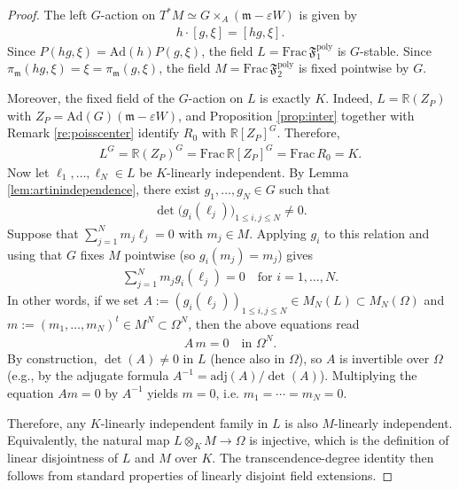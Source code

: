 \documentclass[11pt]{amsart}
\theoremstyle{definition}
\theoremstyle{plain}
\theoremstyle{conclusion}
\begin{document}
\begin{proof}
The left $G$-action on $T^*M\simeq G\times_A(\mathfrak{m}-\varepsilon W)$ is given by
\begin{align*} h\cdot[g,\xi]=[hg,\xi] . \end{align*}
Since $P(hg,\xi) = \mathrm{Ad}(h)P(g,\xi)$, the field $L = \mathrm{Frac}\,\mathfrak{F}_1^{\mathrm{poly}}$ is $G$-stable. Since $\pi_{\mathfrak{m}}(hg,\xi)=\xi=\pi_{\mathfrak{m}}(g,\xi)$, the field $M = \mathrm{Frac}\,\mathfrak{F}_2^{\mathrm{poly}}$ is fixed pointwise by $G$.

Moreover, the fixed field of the $G$-action on $L$ is exactly $K$. Indeed, $L=\mathbb{R}(Z_P)$ with $Z_P = \mathrm{Ad}(G)(\mathfrak{m}-\varepsilon W)$, and Proposition \ref{prop:inter} together with Remark \ref{re:poisscenter} identify $R_0$ with $\mathbb{R}[Z_P]^G$. Therefore, \begin{align*}
L^G = \mathbb{R}(Z_P)^G = \mathrm{Frac}\,\mathbb{R}[Z_P]^G = \mathrm{Frac}\,R_0=K . 
\end{align*} Now let $\ell_1,\ldots,\ell_N\in L$ be $K$-linearly independent. By Lemma \ref{lem:artinindependence}, there exist $g_1,\ldots,g_N\in G$ such that
\begin{align*} \det\big(g_i(\ell_j)\big)_{1\leq i,j\leq N}\neq 0 . \end{align*}
Suppose that $\sum_{j=1}^N m_j\ell_j=0$ with $m_j\in M$. Applying $g_i$ to this relation and using that $G$ fixes $M$ pointwise (so $g_i(m_j) = m_j$) gives
\begin{align*}
 \sum_{j = 1}^N m_j g_i(\ell_j) = 0\quad\text{for }i = 1,\ldots,N .
\end{align*}
In other words, if we set $A:=(g_i(\ell_j))_{1\leq i,j\leq N}\in M_N(L)\subset M_N(\Omega)$ and $m:= (m_1,\ldots,m_N)^t\in M^N\subset \Omega^N$, then the above equations read
\begin{align*}
 A\,m = 0\quad\text{in }\Omega^N.
\end{align*}
By construction, $\det(A)\neq 0$ in $L$ (hence also in $\Omega$), so $A$ is invertible over $\Omega$ (e.g., by the adjugate formula $A^{-1}=\mathrm{adj}(A)/\det(A)$). Multiplying the equation $A m = 0$ by $A^{-1}$ yields $m=0$, i.e. $m_1=\cdots=m_N=0$.

Therefore, any $K$-linearly independent family in $L$ is also $M$-linearly independent. Equivalently, the natural map $L\otimes_K M\to \Omega$ is injective, which is the definition of linear disjointness of $L$ and $M$ over $K$. The transcendence-degree identity then follows from standard properties of linearly disjoint field extensions.
\end{proof}
\end{document}
